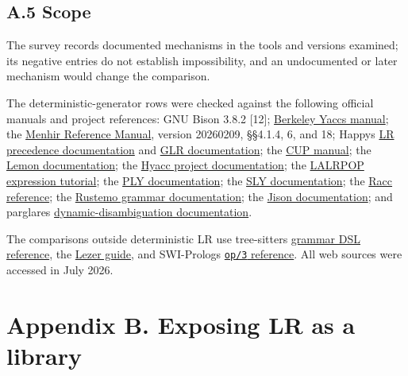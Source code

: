\documentclass[
  10pt,
]{article}
\begin{document}
\hypertarget{a5-scope}{%
\subsection{A.5 Scope}\label{a5-scope}}

The survey records documented mechanisms in the tools and versions
examined; its negative entries do not establish impossibility, and an
undocumented or later mechanism would change the comparison.

The deterministic-generator rows were checked against the following
official manuals and project references: GNU Bison 3.8.2 {[}12{]};
\href{https://invisible-island.net/byacc/manpage/yacc.html}{Berkeley
Yacc\textquotesingle s manual}; the
\href{https://gallium.inria.fr/~fpottier/menhir/manual.html}{Menhir
Reference Manual}, version 20260209, §§4.1.4, 6, and 18;
Happy\textquotesingle s
\href{https://haskell-happy.readthedocs.io/en/latest/using.html\#how-to-specify-precedences}{LR
precedence documentation} and
\href{https://haskell-happy.readthedocs.io/en/2.0.2/glr.html}{GLR
documentation}; the
\href{https://www.cs.princeton.edu/~appel/modern/java/CUP/manual.html}{CUP
manual}; the \href{https://sqlite.org/lemon.html}{Lemon documentation};
the \href{https://hyacc.sourceforge.net/}{Hyacc project documentation};
the
\href{https://lalrpop.github.io/lalrpop/tutorial/004_full_expressions.html}{LALRPOP
expression tutorial}; the
\href{https://ply.readthedocs.io/en/latest/ply.html}{PLY documentation};
the \href{https://sly.readthedocs.io/en/latest/sly.html}{SLY
documentation}; the \href{https://ruby.github.io/racc/index.html}{Racc
reference}; the
\href{https://igordejanovic.net/rustemo/grammar_language.html}{Rustemo
grammar documentation}; the
\href{https://gerhobbelt.github.io/jison/docs/}{Jison documentation};
and parglare\textquotesingle s
\href{https://igordejanovic.net/parglare/stable/disambiguation/\#dynamic-disambiguation-filter}{dynamic-disambiguation
documentation}.

The comparisons outside deterministic LR use
tree-sitter\textquotesingle s
\href{https://tree-sitter.github.io/tree-sitter/creating-parsers/2-the-grammar-dsl.html}{grammar
DSL reference}, the
\href{https://lezer.codemirror.net/docs/guide/\#ambiguity}{Lezer guide},
and SWI-Prolog\textquotesingle s
\href{https://www.swi-prolog.org/pldoc/man?predicate=op/3}{\texttt{op/3}
reference}. All web sources were accessed in July 2026.

\hypertarget{appendix-b-exposing-lr-as-a-library}{%
\section{Appendix B. Exposing LR as a
library}\label{appendix-b-exposing-lr-as-a-library}}
\end{document}
